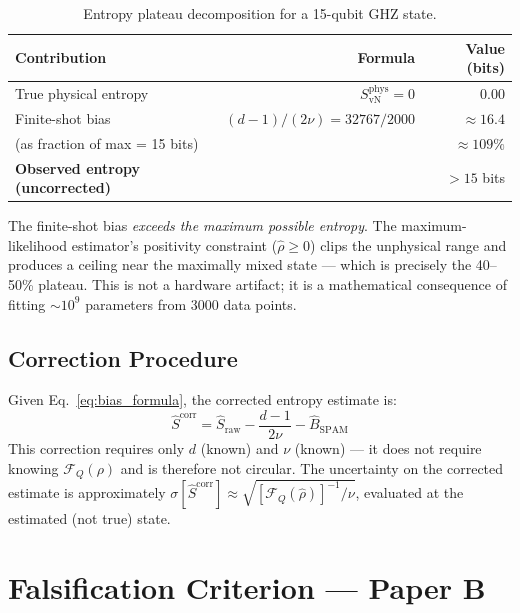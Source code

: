 \documentclass[12pt,letterpaper]{article}
\theoremstyle{plain}
\theoremstyle{definition}
\theoremstyle{remark}
\newcommand{\SvN}{S_{\mathrm{vN}}}
\newcommand{\FQ}{\mathcal{F}_Q}
\newcommand{\bias}{B_{\mathrm{SPAM}}}
\begin{document}
\begin{table}[H]
\centering
\caption{Entropy plateau decomposition for a 15-qubit GHZ state.}
\renewcommand{\arraystretch}{1.25}
\begin{tabular}{@{}lrr@{}}
\toprule
\textbf{Contribution} & \textbf{Formula} & \textbf{Value (bits)} \\
\midrule
True physical entropy & $\SvN^{\mathrm{phys}} = 0$ & 0.00 \\
Finite-shot bias & $(d-1)/(2\nu) = 32767/2000$ & $\approx 16.4$ \\
(as fraction of max = 15 bits) & & $\approx109\%$ \\
\midrule
\textbf{Observed entropy (uncorrected)} & & $>15$ bits \\
\bottomrule
\end{tabular}
\end{table}

The finite-shot bias \emph{exceeds the maximum possible entropy}. The
maximum-likelihood estimator's positivity constraint ($\hat\rho \geq 0$)
clips the unphysical range and produces a ceiling near the maximally
mixed state --- which is precisely the 40--50\% plateau. This is not a
hardware artifact; it is a mathematical consequence of fitting $\sim10^9$
parameters from 3000 data points.

\subsection{Correction Procedure}

Given Eq.~\eqref{eq:bias_formula}, the corrected entropy estimate is:
\begin{equation}
  \hat{S}^{\mathrm{corr}} = \hat{S}_{\mathrm{raw}}
  - \frac{d-1}{2\nu} - \hat\bias
  \tag{B3.2}
  \label{eq:corrected}
\end{equation}
This correction requires only $d$ (known) and $\nu$ (known) --- it does
not require knowing $\FQ(\rho)$ and is therefore not circular.
The uncertainty on the corrected estimate is approximately
$\sigma[\hat{S}^{\mathrm{corr}}] \approx
\sqrt{[\FQ(\hat\rho)]^{-1}/\nu}$, evaluated at the estimated (not
true) state.

\section{Falsification Criterion --- Paper B}
\label{sec:falsification_B}
\end{document}
